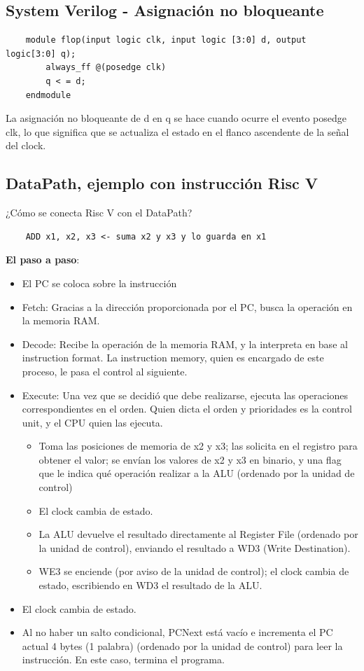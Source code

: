 \documentclass[10pt,a4paper]{article}
\begin{document}
\subsection*{System Verilog - Asignación no bloqueante}
\label{subsec:SVL_bloques_clk}
\begin{lstlisting}
    module flop(input logic clk, input logic [3:0] d, output logic[3:0] q);
        always_ff @(posedge clk)
        q < = d;
    endmodule
\end{lstlisting}
La asignación no bloqueante de d en q se hace cuando ocurre el evento posedge clk, lo que significa que se actualiza el estado en el flanco ascendente de la señal del clock.
\subsection*{DataPath, ejemplo con instrucción Risc V}
\label{subsec:datapath_example}
¿Cómo se conecta Risc V con el DataPath? 
\begin{lstlisting}
    ADD x1, x2, x3 <- suma x2 y x3 y lo guarda en x1
\end{lstlisting}
\textbf{El paso a paso}: 
\begin{itemize}
    \item El PC se coloca sobre la instrucción
    \item Fetch: Gracias a la dirección proporcionada por el PC, busca la operación en la memoria RAM.
    \item Decode: Recibe la operación de la memoria RAM, y la interpreta en base al instruction format. La instruction memory, quien es encargado de este proceso, le pasa el control al siguiente. 
    \item Execute: Una vez que se decidió que debe realizarse, ejecuta las operaciones correspondientes en el orden. Quien dicta el orden y prioridades es la control unit, y el CPU quien las ejecuta.
    \begin{itemize}
        \item Toma las posiciones de memoria de x2 y x3; las solicita en el registro para obtener el valor; se envían los valores de x2 y x3 en binario, y una flag que le indica qué operación realizar a la ALU (ordenado por la unidad de control)
        \item El clock cambia de estado. 
        \item La ALU devuelve el resultado directamente al Register File (ordenado por la unidad de control), enviando el resultado a WD3 (Write Destination).
        \item WE3 se enciende (por aviso de la unidad de control); el clock cambia de estado, escribiendo en WD3 el resultado de la ALU.
    \end{itemize}
    \item El clock cambia de estado. 
    \item Al no haber un salto condicional, PCNext está vacío e incrementa el PC actual 4 bytes (1 palabra) (ordenado por la unidad de control) para leer la instrucción. En este caso, termina el programa. 
\end{itemize}
\end{document}
